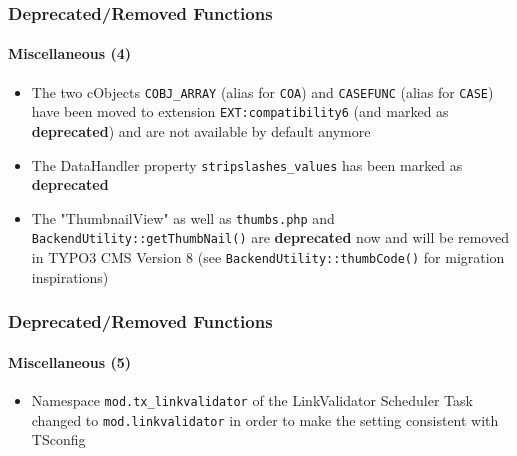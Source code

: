 \begin{frame}[fragile]
	\frametitle{Deprecated/Removed Functions}
	\framesubtitle{Miscellaneous (4)}

	\lstset{basicstyle=\tiny\ttfamily}

	\begin{itemize}

		\item The two cObjects
			\small\texttt{COBJ\_ARRAY}\normalsize\space
			(alias for \texttt{COA})
			and
			\small\texttt{CASEFUNC}\normalsize\space
			(alias for \texttt{CASE})
			have been moved to extension \texttt{EXT:compatibility6}
			(and marked as \textbf{deprecated}) and are not available
			by default anymore

		\item The DataHandler property
			\small\texttt{stripslashes\_values}\normalsize\space
			has been marked as \textbf{deprecated}

		\item The "ThumbnailView" as well as \texttt{thumbs.php} and \texttt{BackendUtility::getThumbNail()}
			are \textbf{deprecated} now and will be removed in TYPO3 CMS Version 8\newline
			(see \texttt{BackendUtility::thumbCode()} for migration inspirations)

	\end{itemize}

\end{frame}


\begin{frame}[fragile]
	\frametitle{Deprecated/Removed Functions}
	\framesubtitle{Miscellaneous (5)}

	\lstset{basicstyle=\tiny\ttfamily}

	\begin{itemize}

		\item Namespace \texttt{mod.tx\_linkvalidator} of the LinkValidator
			Scheduler Task changed to \texttt{mod.linkvalidator} in order
			to make the setting consistent with TSconfig

	\end{itemize}

\end{frame}

